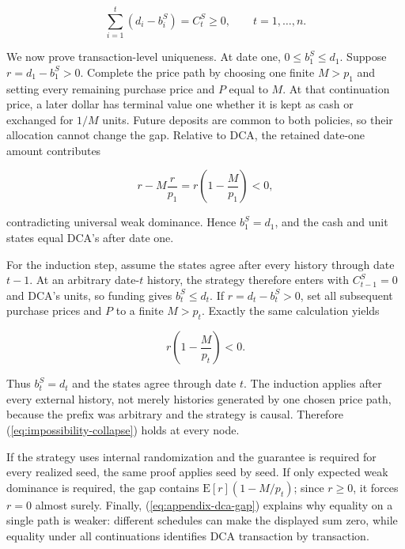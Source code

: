 \documentclass[12pt,a4paper,oneside]{report}
\begin{document}
\begin{equation}
  \sum_{i=1}^{t}(d_i-b_i^S)=C_t^S\geq0,
  \qquad t=1,\ldots,n.
  \label{eq:appendix-prefix-funding}
\end{equation}

We now prove transaction-level uniqueness. At date one,
$0\leq b_1^S\leq d_1$. Suppose
$r=d_1-b_1^S>0$. Complete the price path by choosing one finite
$M>p_1$ and setting every remaining purchase price and $P$ equal to $M$.
At that continuation price, a later dollar has terminal value one whether it
is kept as cash or exchanged for $1/M$ units. Future deposits are common to
both policies, so their allocation cannot change the gap. Relative to DCA, the
retained date-one amount contributes

\begin{equation}
  r-M\frac{r}{p_1}
  =r\left(1-\frac{M}{p_1}\right)<0,
  \label{eq:proof-first-adverse-gap}
\end{equation}

contradicting universal weak dominance. Hence $b_1^S=d_1$, and the cash and
unit states equal DCA's after date one.

For the induction step, assume the states agree after every history through
date $t-1$. At an arbitrary date-$t$ history, the strategy therefore enters
with $C_{t-1}^S=0$ and DCA's units, so funding gives
$b_t^S\leq d_t$. If $r=d_t-b_t^S>0$, set all subsequent purchase prices and
$P$ to a finite $M>p_t$. Exactly the same calculation yields

\begin{equation}
  r\left(1-\frac{M}{p_t}\right)<0.
  \label{eq:appendix-impossibility-induction-gap}
\end{equation}

Thus $b_t^S=d_t$ and the states agree through date $t$. The induction applies
after every external history, not merely histories generated by one chosen
price path, because the prefix was arbitrary and the strategy is causal.
Therefore (\ref{eq:impossibility-collapse}) holds at every node.

If the strategy uses internal randomization and the guarantee is required for
every realized seed, the same proof applies seed by seed. If only expected
weak dominance is required, the gap contains
$\mathrm{E}[r](1-M/p_t)$; since $r\geq0$, it forces $r=0$ almost surely. Finally,
(\ref{eq:appendix-dca-gap}) explains why equality on a single path is weaker:
different schedules can make the displayed sum zero, while equality under all
continuations identifies DCA transaction by transaction.
\end{document}

